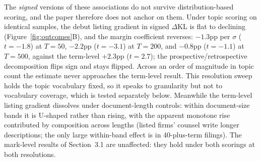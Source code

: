 \documentclass[11pt]{article}
\newcommand{\dkl}{$\Delta$KL}
\begin{document}
The \emph{signed} versions of these associations do not survive
distribution-based scoring, and the paper therefore does not anchor on
them. Under topic scoring on identical samples, the debut listing
gradient in signed \dkl{} is flat to declining
(Figure~\ref{fig:outcomes}B), and the margin coefficient reverses:
$-1.3$pp per $\sigma$ ($t = -1.8$) at $T = 50$, $-2.2$pp ($t = -3.1$) at
$T = 200$, and $-0.8$pp ($t = -1.1$) at $T = 500$, against the term-level
$+2.3$pp ($t = 2.7$); the prospective/retrospective decomposition flips
sign and stays flipped. Across an order of magnitude in topic count the
estimate never approaches the term-level result. This resolution sweep
holds the topic vocabulary fixed, so it speaks to granularity but not to
vocabulary coverage, which is tested separately below. Meanwhile the term-level
listing gradient dissolves under document-length controls: within
document-size bands it is U-shaped rather than rising, with the apparent
monotone rise contributed by composition across lengths (listed firms'
counsel write longer descriptions; the only large within-band effect is
in 40-plus-term filings). The mark-level results of Section~3.1 are
unaffected: they hold under both scorings at both resolutions.
\end{document}

